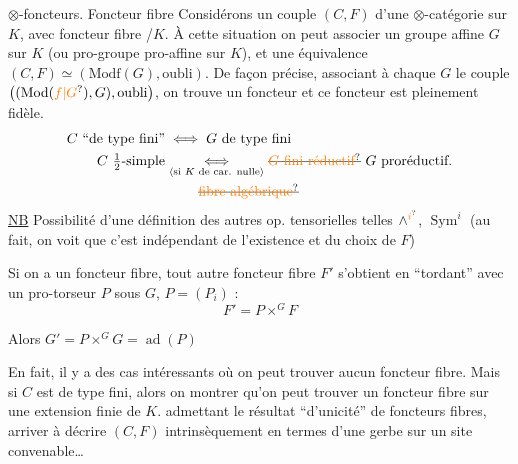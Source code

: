 $\otimes$-foncteurs. Foncteur fibre  Considérons un couple $(C,F)$  d'une $\otimes$-catégorie sur $K$, avec foncteur fibre  /$K$. À cette situation  on peut associer un groupe  affine $G$ sur $K$ (ou pro-groupe pro-affine sur $K$), et une équivalence $(C,F)\simeq(\mathrm{Modf}(G),\text{oubli})$.
De façon précise, associant à chaque $G$ le couple $\bigl((\mathrm{Mod}(\unsure{f|G}),G),\text{oubli}\bigr)$, on trouve un foncteur
et ce foncteur est pleinement fidèle.
\[
\begin{aligned}
C\ \text{``de type fini''}&\iff G\text{ de type fini}\\
C\ \tfrac12\text{-simple}&\underset{\inserted{\text{si }K\text{ de car. nulle}}}{\iff}\deleted{\unsure{G\ \text{fini réductif}}}\ G\text{ proréductif}.\\
&\phantom{\iff}\deleted{\unsure{\text{fibre algébrique}}}
\end{aligned}
\]
\uline{NB} Possibilité d'une définition des autres op. tensorielles telles $\wedge^{\unsure{i}}$, $\operatorname{Sym}^i$ (au fait, on voit que c'est indépendant de l'existence et du choix de $F$)

Si on a un foncteur fibre, tout autre foncteur fibre $F'$ s'obtient en ``tordant'' avec un pro-torseur $P$ sous $G$, $P=(P_i)$ :
\[
F'=P\times^G F
\]

Alors $G'=P\times^G G=\operatorname{ad}(P)$

En fait, il y a des cas intéressants où  on peut trouver aucun foncteur fibre. Mais si $C$ est de type fini, alors on  montrer qu'on peut trouver un foncteur fibre sur une extension finie de $K$.   admettant le résultat ``d'unicité'' de foncteurs fibres,  arriver à décrire $(C,F)$ intrinsèquement en termes d'une gerbe sur un site convenable\ldots

